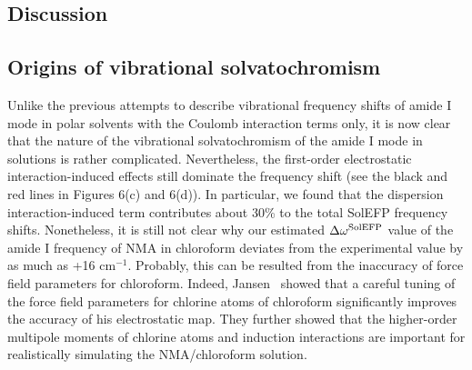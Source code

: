 \documentclass[a4paper,titlepage,twoside,fleqn,12pt]{book}
\begin{document}
\begin{refsection}
\section{Discussion}

\subsection{Origins of vibrational solvatochromism}

Unlike the previous attempts to describe vibrational
frequency shifts of amide I mode in polar solvents with the
Coulomb interaction terms only, it is now clear that the nature
of the vibrational solvatochromism of the amide I mode in
solutions is rather complicated. Nevertheless, the first\hyp{}order
electrostatic interaction\hyp{}induced effects still dominate the
frequency shift (see the black and red lines in Figures 6(c) and
6(d)). In particular, we found that the dispersion interaction\hyp{}induced
term contributes about 30\% to the total SolEFP
frequency shifts. Nonetheless, it is still not clear why our
estimated $\Delta\omega^{\rm SolEFP}$ value of the amide I frequency of NMA in
chloroform deviates from the experimental value by as much
as +16 cm$^{-1}$. Probably, this can be resulted from the inaccuracy
of force field parameters for chloroform. Indeed, Jansen~\citep{Jansen.JPCB.2014}
showed that a careful tuning of the force field parameters
for chlorine atoms of chloroform significantly improves the
accuracy of his electrostatic map. They further showed that
the higher\hyp{}order multipole moments of chlorine atoms and
induction interactions are important for realistically simulating
the NMA/chloroform solution.


\end{refsection}
\end{document}
